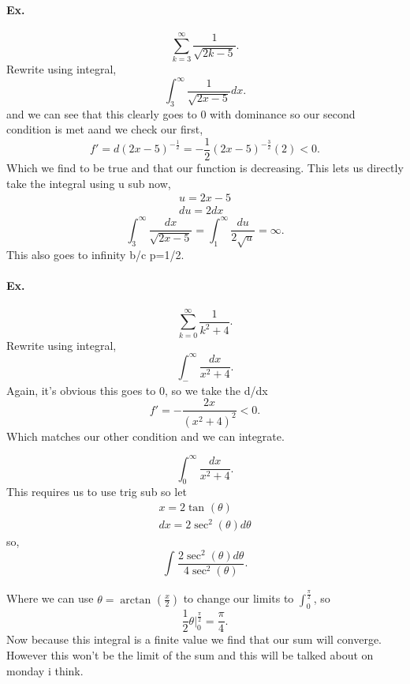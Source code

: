 \paragraph{Ex.}
\[
\sum_{ k=3 } ^{ \infty } \frac{ 1 }{ \sqrt{ 2k-5} } 
.\] 
Rewrite using integral,
\[
\int_{ 3 }^{ \infty } \frac{ 1 }{ \sqrt{ 2x-5} } dx
.\] 
and we can see that this clearly goes to 0 with dominance so our second condition is met aand we check our first,
\[
f'=d\left( 2x-5 \right) ^{ -\frac{ 1 }{ 2 }  }=-\frac{ 1 }{ 2 } \left( 2x-5 \right) ^{ -\frac{ 3 }{ 2 }  }\left( 2 \right) <0
.\] 
Which we find to be true and that our function is decreasing. This lets us directly take the integral using u sub now,
\begin{gather*}
u=2x-5 \\
du = 2dx
\end{gather*}
\[
\int_{ 3 }^{ \infty } \frac{ dx }{ \sqrt{ 2x-5} }=\int_{ 1 }^{ \infty } \frac{ du }{ 2\sqrt{ u} } =\infty
.\] 
This also goes to infinity b/c p=1/2.

\paragraph{Ex.}
\[
\sum_{ k=0 } ^{ \infty } \frac{ 1 }{ k^2+4 } 
.\] 
Rewrite using integral,
\[
\int_{ - }^{ \infty } \frac{ dx }{ x^2+4 } 
.\] 
Again, it's obvious this goes to 0, so we take the d/dx
\[
f'=-\frac{ 2x }{ \left( x^2+4 \right) ^2 } <0
.\] 
Which matches our other condition and we can integrate.

\[
\int_{ 0 }^{ \infty } \frac{ dx }{ x^2+4 } 
.\] 
This requires us to use trig sub so let
\begin{gather*}
x=2\tan^{  } \left( \theta \right) \\
dx=2\sec^{ 2 } \left( \theta \right) d\theta
\end{gather*}
so,
\[
\int_{  }^{ } \frac{ 2\sec^{ 2 } \left( \theta \right) d\theta }{ 4\sec^{ 2 } \left( \theta \right)  }
.\] 

Where we can use $ \theta = \arctan^{  }\left( \frac{ x }{ 2 }  \right) $ to change our limits to $ \int_{ 0 }^{ \frac{ \pi }{ 2 }  }  $, so
\[
\frac{ 1 }{ 2 } \theta \bigg|_{ 0 }^{ \frac{ \pi }{ 2 }  } =\frac{ \pi }{ 4 }
.\] 
Now because this integral is a finite value we find that our sum will converge. However this won't be the limit of the sum and this will be talked about on monday i think.
